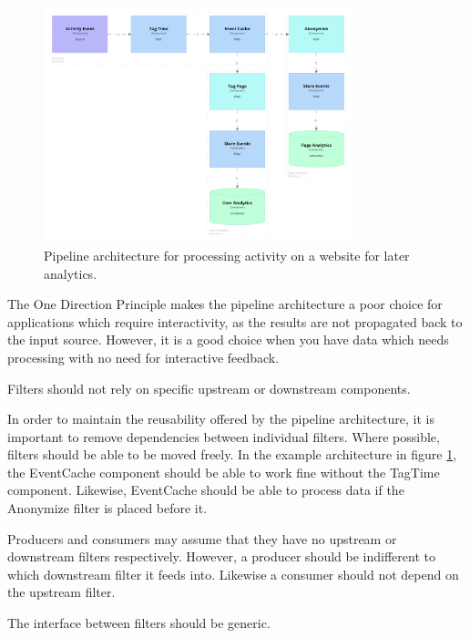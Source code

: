 \begin{figure}
    \centering
    \includegraphics[trim=10 20 10 20,clip,width=0.8\textwidth]{diagrams/activity-tracking.png}
    \caption{Pipeline architecture for processing activity on a website for later analytics.}
    \label{fig:analytics}
\end{figure}

The One Direction Principle makes the pipeline architecture a poor choice for applications which require interactivity,
as the results are not propagated back to the input source.
However, it is a good choice when you have data which needs processing with no need for interactive feedback.

\begin{definition}\label{independent}
Filters should not rely on specific upstream or downstream components.
\end{definition}

In order to maintain the reusability offered by the pipeline architecture,
it is important to remove dependencies between individual filters.
Where possible, filters should be able to be moved freely.
In the example architecture in figure \ref{fig:analytics},
the EventCache component should be able to work fine without
the TagTime component.
Likewise, EventCache should be able to process data if the
Anonymize filter is placed before it.

Producers and consumers may assume that they have no upstream or downstream filters respectively.
However, a producer should be indifferent to which downstream filter it feeds into.
Likewise a consumer should not depend on the upstream filter.

\begin{corollary}\label{interface}
    The interface between filters should be generic.
\end{corollary}


